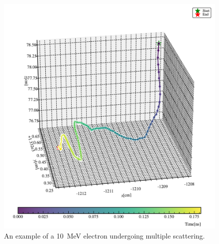 \begin{figure}
	\begin{center}
		\includegraphics[width=\textwidth]{reconstruction/emmisionProfile/multiscatter.pdf}
	\end{center}
	\caption{An example of a \SI{10}{MeV} electron undergoing multiple scattering.}
	\label{fig:multipleScattering}
\end{figure}

